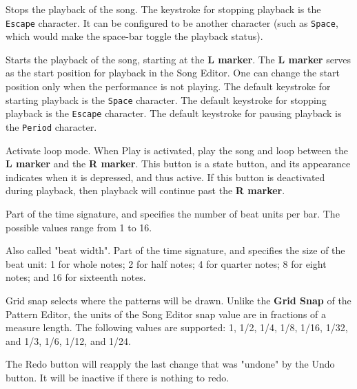    \setcounter{ItemCounter}{0}      %

   Stops the playback of the song.
   The keystroke for stopping playback is the \texttt{Escape} character.
   It can be configured to be another character (such as \texttt{Space}, which
   would make the space-bar toggle the playback status).

   Starts the playback of the song, starting at the \textbf{L marker}.
   The \textbf{L marker} serves as the start position for playback
   in the Song Editor.  One can change the start position only when the
   performance is not playing.
   The default keystroke for starting playback is the \texttt{Space} character.
   The default keystroke for stopping playback is the \texttt{Escape} character.
   The default keystroke for pausing playback is the \texttt{Period} character.

   Activate loop mode. When Play is activated,  play the song and loop
   between the
   \textbf{L marker} and the \textbf{R marker}.
   This button is a state button, and its appearance indicates when it is
   depressed, and thus active.
   If this button is deactivated during playback, then playback will
   continue past the \textbf{R marker}.

   Part of the time signature, and specifies the number of beat units per bar.
   The possible values range from 1 to 16.

   Also called "beat width".
   Part of the time signature, and specifies the size of the beat unit:
   1 for whole notes; 2 for half notes; 4 for quarter notes; 8 for eight notes;
   and 16 for sixteenth notes.

   Grid snap selects where the patterns will be drawn.
   Unlike the \textbf{Grid Snap} of the Pattern Editor, the units
   of the Song Editor snap value are in fractions of a measure length.
   The following values are supported:
   1, 1/2, 1/4, 1/8, 1/16, 1/32, and 1/3, 1/6, 1/12, and 1/24.

   The Redo button will reapply the last change that was "undone" by
   the Undo button.
   It will be inactive if there is nothing to redo.

